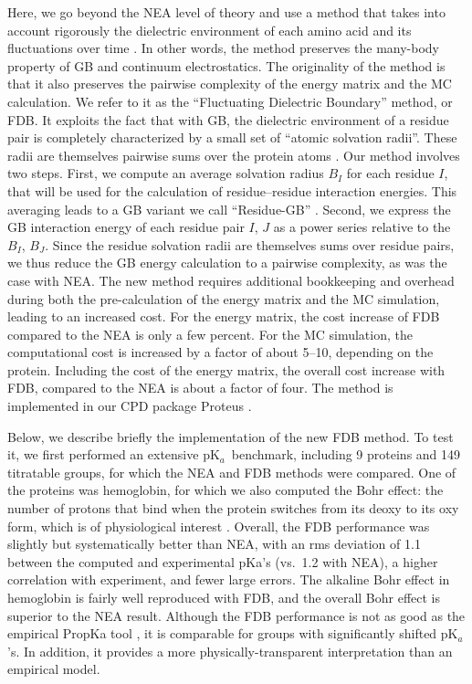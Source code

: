 \documentclass[a4paper,12pt]{article}
\newcommand{\pk}{pK$_a$}
\begin{document}
Here, we go beyond the NEA level of theory and use a method that takes into account rigorously the dielectric environment
of each amino acid and its fluctuations over time \cite{Archontis05b}. In other words, the method preserves the many-body
property of GB and continuum electrostatics. The originality of the method is that it also preserves the pairwise complexity
of the energy matrix and the MC calculation. We refer to it as the ``Fluctuating Dielectric Boundary'' method, or FDB.
It exploits the fact that with GB, the dielectric environment of a residue pair is completely characterized by a small
set of ``atomic solvation radii''. These radii are themselves pairwise sums over the protein atoms \cite{Hawkins95,
Schaefer96}. Our method involves two steps. First, we compute an average solvation radius $B_I$ for each residue $I$,
that will be used for the calculation of residue--residue interaction energies. This averaging leads to a GB variant
we call ``Residue-GB'' \cite{Archontis05b}. Second, we express the GB interaction energy of each residue pair $I$, $J$
as a power series relative to the $B_I$, $B_J$. Since the residue solvation radii are themselves sums over residue pairs,
we thus reduce the GB energy calculation to a pairwise complexity, as was the case with NEA. The new method requires
additional bookkeeping and overhead during both the pre-calculation of the energy matrix and the MC simulation, leading
to an increased cost. For the energy matrix, the cost increase of FDB compared to the NEA is only a few percent. For
the MC simulation, the computational cost is increased by a factor of about 5--10, depending on the protein. Including
the cost of the energy matrix, the overall cost increase with FDB, compared to the NEA is about a factor of four. The
method is implemented in our CPD package Proteus \cite{Schmidt08,Simonson13b,Polydorides16}.

Below, we describe briefly the implementation of the new FDB method. To test it, we first performed an extensive \pk\
benchmark, including 9 proteins and 149 titratable groups, for which the NEA and FDB methods were compared. One
of the proteins was hemoglobin, for which we also computed the Bohr effect: the number of protons that bind when the
protein switches from its deoxy to its oxy form, which is of physiological interest \cite{PerutzBK,Zheng13}. Overall,
the FDB performance was slightly but systematically better than NEA, with an rms deviation of 1.1 between the computed
and experimental pKa’s (vs.\ 1.2 with NEA), a higher correlation with experiment, and fewer large errors. The alkaline
Bohr effect in hemoglobin is fairly well reproduced with FDB, and the overall Bohr effect is superior to the NEA result.
Although the FDB performance is not as good as the empirical PropKa tool \cite{Olsson11}, it is comparable for groups
with significantly shifted \pk’s. In addition, it provides a more physically-transparent interpretation than an empirical
model.
\end{document}
